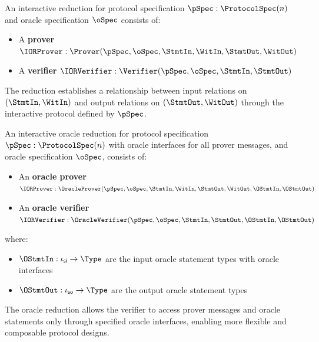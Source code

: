 \begin{definition}
    \label{def:reduction}
    An interactive reduction for protocol specification \(\pSpec : \ProtocolSpec(n)\) and oracle specification \(\oSpec\) consists of:
    \begin{itemize}
        \item A \textbf{prover} \(\IORProver : \Prover(\pSpec, \oSpec, \StmtIn, \WitIn, \StmtOut, \WitOut)\)
        \item A \textbf{verifier} \(\IORVerifier : \Verifier(\pSpec, \oSpec, \StmtIn, \StmtOut)\)
    \end{itemize}

    The reduction establishes a relationship between input relations on \((\StmtIn, \WitIn)\) and output relations on \((\StmtOut, \WitOut)\) through the interactive protocol defined by \(\pSpec\).
    \leanok
\end{definition}

\begin{definition}
    \label{def:oracle_reduction}
    An interactive oracle reduction for protocol specification \(\pSpec : \ProtocolSpec(n)\) with oracle interfaces for all prover messages, and oracle specification \(\oSpec\), consists of:
    \begin{itemize}
        \item An \textbf{oracle prover} \(\IORProver : \OracleProver(\pSpec, \oSpec, \StmtIn, \WitIn, \StmtOut, \WitOut, \OStmtIn, \OStmtOut)\)
        \item An \textbf{oracle verifier} \(\IORVerifier : \OracleVerifier(\pSpec, \oSpec, \StmtIn, \StmtOut, \OStmtIn, \OStmtOut)\)
    \end{itemize}

    where:
    \begin{itemize}
        \item \(\OStmtIn : \iota_{\mathsf{si}} \to \Type\) are the input oracle statement types with oracle interfaces
        \item \(\OStmtOut : \iota_{\mathsf{so}} \to \Type\) are the output oracle statement types
    \end{itemize}

    The oracle reduction allows the verifier to access prover messages and oracle statements only through specified oracle interfaces, enabling more flexible and composable protocol designs.
    \leanok
\end{definition}

